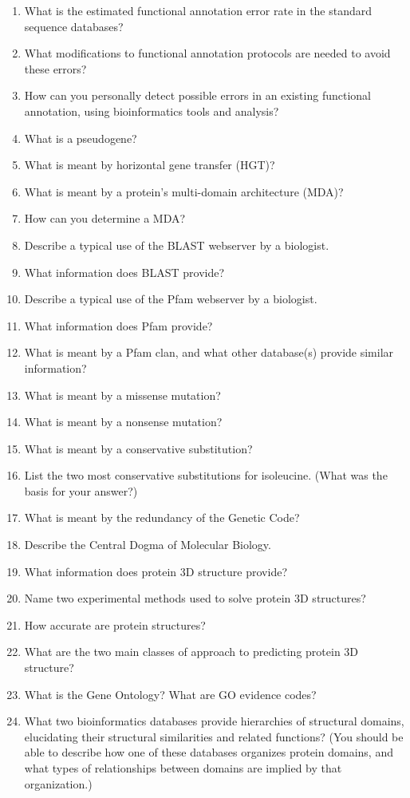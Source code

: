 \documentclass[11pt]{article}
\begin{document}
\begin{enumerate}
\item What is the estimated functional annotation error rate in the standard sequence databases?
\item What modifications to functional annotation protocols are needed to avoid these errors?
\item How can you personally detect possible errors in an existing functional annotation, using bioinformatics tools and analysis?
\item What is a pseudogene?
\item What is meant by horizontal gene transfer (HGT)?
\item What is meant by a protein’s multi-domain architecture (MDA)?
\item How can you determine a MDA?
\item Describe a typical use of the BLAST webserver by a biologist.
\item What information does BLAST provide?
\item Describe a typical use of the Pfam webserver by a biologist.
\item What information does Pfam provide?
\item What is meant by a Pfam clan, and what other database(s) provide similar information?
\item What is meant by a missense mutation?
\item What is meant by a nonsense mutation?
\item What is meant by a conservative substitution?
\item List the two most conservative substitutions for isoleucine. (What was the basis for your answer?)
\item What is meant by the redundancy of the Genetic Code?
\item Describe the Central Dogma of Molecular Biology.
\item What information does protein 3D structure provide?
\item Name two experimental methods used to solve protein 3D structures?
\item How accurate are protein structures?
\item What are the two main classes of approach to predicting protein 3D structure? 
\item What is the Gene Ontology? What are GO evidence codes?
\item What two bioinformatics databases provide hierarchies of structural domains, elucidating their structural similarities and related functions? (You should be able to describe how one of these databases organizes protein domains, and what types of relationships between domains are implied by that organization.)

\end{enumerate}
\end{document}
